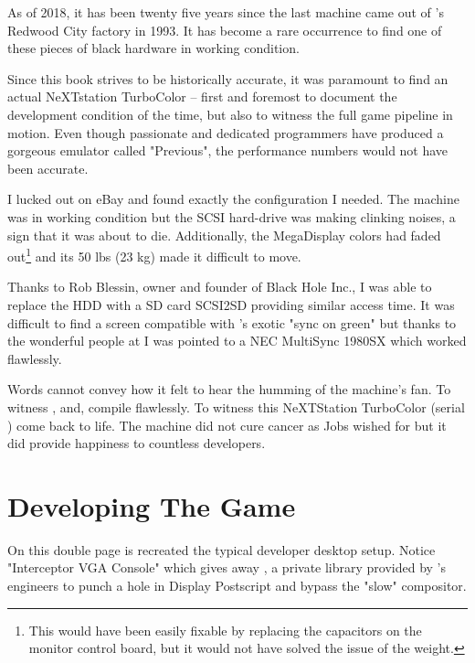  As of 2018, it has been twenty five years since the last machine came out of \NeXT{}'s Redwood City factory in 1993. It has become a rare occurrence to find one of these pieces of black hardware in working condition.\\
 \par
 Since this book strives to be historically accurate, it was paramount to find an actual NeXTstation TurboColor -- first and foremost to document the development condition of the time, but also to witness the full game pipeline in motion. Even though passionate and dedicated programmers have produced a gorgeous emulator called "Previous", the performance numbers would not have been accurate.\\
 \par
  I lucked out on eBay and found exactly the configuration I needed. The machine was in working condition but the SCSI hard-drive was making clinking noises, a sign that it was about to die. Additionally, the MegaDisplay colors had faded out\footnote{This would have been easily fixable by replacing the capacitors on the monitor control board, but it would not have solved the issue of the weight.} and its 50 lbs (23 kg) made it difficult to move.\\
  \par
  Thanks to Rob Blessin, owner and founder of Black Hole Inc., I was able to replace the HDD with a SD card SCSI2SD providing similar access time. It was difficult to find a screen compatible with \NeXTns{}'s exotic "sync on green" but thanks to the wonderful people at  I was pointed to a NEC MultiSync 1980SX which worked flawlessly.\\
  \par
  Words cannot convey how it felt to hear the humming of the machine's fan. To witness ,  and,  compile flawlessly. To witness this NeXTStation TurboColor (serial ) come back to life. The machine did not cure cancer as Jobs wished for but it did provide happiness to countless developers.





\section{Developing The Game}
On this double page is recreated the typical developer desktop setup. Notice "Interceptor VGA Console" which gives away , a private library provided by \NeXTns's engineers to punch a hole in Display Postscript and bypass the "slow" compositor.\\
\par
{}

